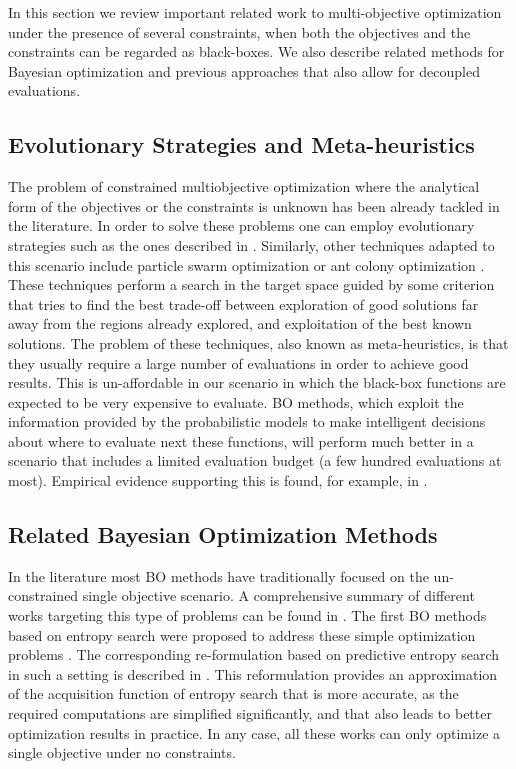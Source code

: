 \documentclass[review,preprint,12pt]{elsarticle}
\begin{document}
In this section we review important related work to multi-objective optimization under the presence
of several constraints, when both the objectives and the constraints can be regarded as black-boxes. 
We also describe related methods for Bayesian optimization and previous approaches that also allow for 
decoupled evaluations.

\subsection{Evolutionary Strategies and Meta-heuristics}

The problem of constrained multiobjective optimization where the analytical form of 
the objectives or the constraints is unknown has been already tackled in the literature. 
In order to solve these problems one can employ evolutionary 
strategies such as the ones described in \citep{fonseca1998multiobjective,cai2006multiobjective}. 
Similarly, other techniques adapted to this scenario include particle swarm 
optimization \citep{coello2004handling} or ant colony optimization \citep{alaya2007ant}.
These techniques perform a search in the target space guided 
by some criterion that tries to find the best trade-off between exploration of 
good solutions far away from the regions already explored, and exploitation of the best 
known solutions. The problem of these techniques, also known as meta-heuristics, is that 
they usually require a large number of evaluations in order to achieve good results. 
This is un-affordable in our scenario in which the black-box functions are expected
to be very expensive to evaluate. BO methods, which exploit the information provided
by the probabilistic models to make intelligent decisions about where to evaluate next
these functions, will perform much better in a scenario that includes a limited 
evaluation budget (a few hundred evaluations at most). Empirical 
evidence supporting this is found, for example, in \citep{lobato16_accelerator,mlrMBO2017}.

\subsection{Related Bayesian Optimization Methods}

In the literature most BO methods have traditionally focused on the un-constrained single objective
scenario. A comprehensive summary of different works targeting this type of problems can be found
in \citep{brochu2010tutorial,shahriari2016taking}. 
The first BO methods based on entropy search were proposed to address these simple optimization problems 
\citep{hennig2012entropy,villemonteix2009informational}. The corresponding re-formulation 
based on predictive entropy search in such a setting is described in \citep{hernandez2014predictive}.
This reformulation provides an approximation of the acquisition function of entropy search that 
is more accurate, as the required computations are simplified significantly, and that also leads 
to better optimization results in practice. In any case, all these works can only optimize a single objective under no constraints.
\end{document}

